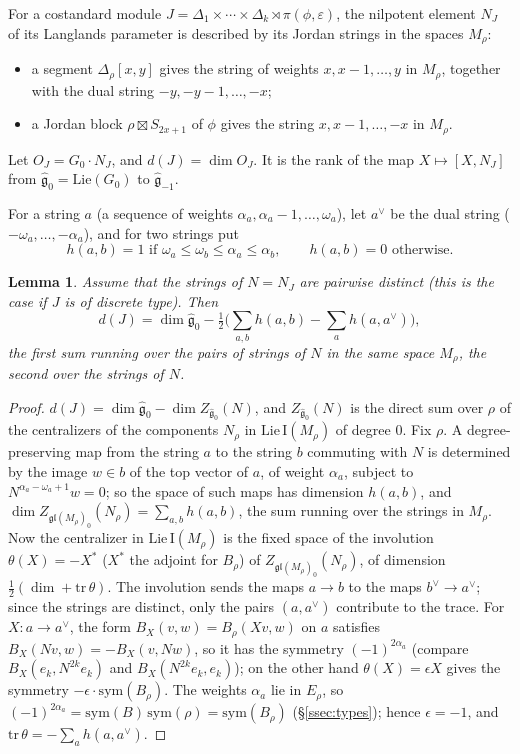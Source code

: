\documentclass[a4paper,12pt,leqno]{amsart}
\theoremstyle{plain}
\newtheorem{lemma}[thm]{Lemma}
\theoremstyle{definition}
\begin{document}
For a costandard module $J=\Delta_1\times\cdots\times\Delta_k\rtimes\pi(\phi,\varepsilon)$, the nilpotent
element $N_J$ of its Langlands parameter is described by its Jordan strings in the spaces $M_\rho$:
\begin{itemize}
\item a segment $\Delta_\rho[x,y]$ gives the string of weights $x,x-1,\ldots,y$ in $M_\rho$, together with
the dual string $-y,-y-1,\ldots,-x$;
\item a Jordan block $\rho\boxtimes S_{2x+1}$ of $\phi$ gives the string $x,x-1,\ldots,-x$ in $M_\rho$.
\end{itemize}
Let $O_J=G_0\cdot N_J$, and $d(J)=\dim O_J$. It is the rank of the map $X\mapsto[X,N_J]$ from
$\widehat{\mathfrak g}_0=\mathrm{Lie}(G_0)$ to $\widehat{\mathfrak g}_{-1}$.

For a string $a$ (a sequence of weights $\alpha_a,\alpha_a-1,\ldots,\omega_a$), let $a^\vee$ be the dual string
($-\omega_a,\ldots,-\alpha_a$), and for two strings put
\[h(a,b)=1\text{ if }\omega_a\leq \omega_b\leq \alpha_a\leq \alpha_b,\qquad h(a,b)=0\text{ otherwise}.\]

\begin{lemma}\label{lem:dimformula} Assume that the strings of $N=N_J$ are pairwise distinct (this is
the case if $J$ is of discrete type). Then
\[d(J)=\dim\widehat{\mathfrak g}_0-\tfrac12\Big(\sum_{a,b}h(a,b)-\sum_a h(a,a^\vee)\Big),\]
the first sum running over the pairs of strings of $N$ in the same space $M_\rho$, the second over the
strings of $N$.
\end{lemma}

\begin{proof}
$d(J)=\dim\widehat{\mathfrak g}_0-\dim Z_{\widehat{\mathfrak g}_0}(N)$, and $Z_{\widehat{\mathfrak g}_0}(N)$ is
the direct sum over $\rho$ of the centralizers of the components $N_\rho$ in $\mathrm{Lie}\,\mathrm{I}(M_\rho)$
of degree $0$. Fix $\rho$. A degree-preserving map from the string $a$ to the string $b$ commuting with
$N$ is determined by the image $w\in b$ of the top vector of $a$, of weight $\alpha_a$, subject to
$N^{\alpha_a-\omega_a+1}w=0$; so the space of such maps has dimension $h(a,b)$, and $\dim
Z_{\mathfrak{gl}(M_\rho)_0}(N_\rho)=\sum_{a,b}h(a,b)$, the sum running over the strings in $M_\rho$. Now
the centralizer in $\mathrm{Lie}\,\mathrm{I}(M_\rho)$ is the fixed space of the involution $\theta(X)=-X^*$
($X^*$ the adjoint for $B_\rho$) of $Z_{\mathfrak{gl}(M_\rho)_0}(N_\rho)$, of dimension
$\frac12(\dim+\mathrm{tr}\,\theta)$. The involution sends the maps $a\to b$ to the maps $b^\vee\to
a^\vee$; since the strings are distinct, only the pairs $(a,a^\vee)$ contribute to the trace. For
$X:a\to a^\vee$, the form $B_X(v,w)=B_\rho(Xv,w)$ on $a$ satisfies $B_X(Nv,w)=-B_X(v,Nw)$, so it has
the symmetry $(-1)^{2\alpha_a}$ (compare $B_X(e_k,N^{2k}e_k)$ and $B_X(N^{2k}e_k,e_k)$); on the other hand
$\theta(X)=\epsilon X$ gives the symmetry $-\epsilon\cdot\mathrm{sym}(B_\rho)$. The weights $\alpha_a$ lie in
$E_\rho$, so $(-1)^{2\alpha_a}=\mathrm{sym}(B)\,\mathrm{sym}(\rho)=\mathrm{sym}(B_\rho)$
(\S\ref{ssec:types}); hence $\epsilon=-1$, and $\mathrm{tr}\,\theta=-\sum_ah(a,a^\vee)$.
\end{proof}
\end{document}
